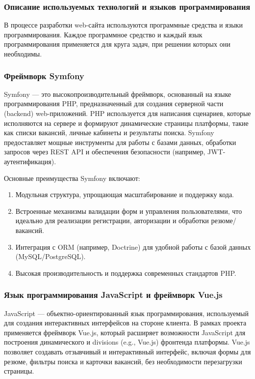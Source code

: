 \subsubsection{Описание используемых технологий и языков программирования}

В процессе разработки web-сайта используются программные средства и языки программирования. Каждое программное средство и каждый язык программирования применяется для круга задач, при решении которых они необходимы.

\subsubsection{Фреймворк Symfony}        

Symfony — это высокопроизводительный фреймворк, основанный на языке программирования PHP, предназначенный для создания серверной части (backend) web-приложений. PHP используется для написания сценариев, которые исполняются на сервере и формируют динамические страницы платформы, такие как списки вакансий, личные кабинеты и результаты поиска. Symfony предоставляет мощные инструменты для работы с базами данных, обработки запросов через REST API и обеспечения безопасности (например, JWT-аутентификация).

Основные преимущества Symfony включают:

\begin{enumerate}
	\item Модульная структура, упрощающая масштабирование и поддержку кода.
	\item Встроенные механизмы валидации форм и управления пользователями, что идеально для реализации регистрации, авторизации и обработки резюме/вакансий.
	\item Интеграция с ORM (например, Doctrine) для удобной работы с базой данных (MySQL/PostgreSQL).
	\item Высокая производительность и поддержка современных стандартов PHP.
\end{enumerate}

                                                             
\subsubsection{Язык  программирования JavaScript и фреймворк Vue.js}

JavaScript — объектно-ориентированный язык программирования, используемый для создания интерактивных интерфейсов на стороне клиента. В рамках проекта применяется фреймворк Vue.js, который расширяет возможности JavaScript для построения динамического и divisions (e.g., Vue.js) фронтенда платформы. Vue.js позволяет создавать отзывчивый и интерактивный интерфейс, включая формы для резюме, фильтры поиска и карточки вакансий, без необходимости перезагрузки страницы.

